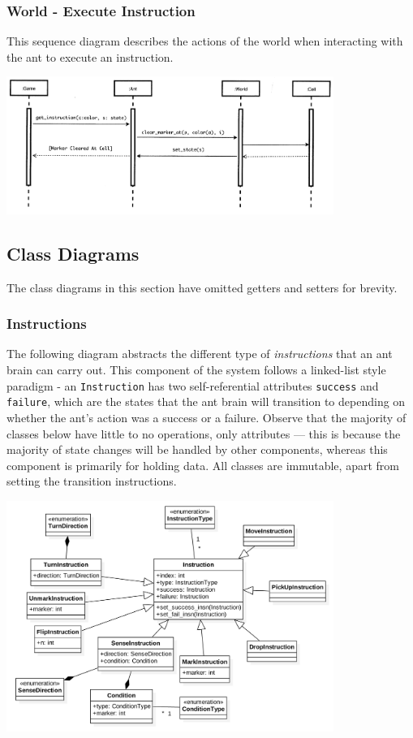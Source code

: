 \documentclass[11pt]{article}
\begin{document}
\subsubsection{World - Execute Instruction}

This sequence diagram describes the actions of the world when interacting with the ant to execute an instruction.

\begin{center}
\includegraphics[width=0.8\textwidth]{low-level-diagrams/sequence/ant-unmark.png}
\end{center}

\subsection{Class Diagrams}

The class diagrams in this section have omitted getters and setters for brevity.

\subsubsection{Instructions}

The following diagram abstracts the different type of \textit{instructions} that an ant brain can carry out. This component of the system follows a linked-list style paradigm - an \texttt{Instruction} has two self-referential attributes \texttt{success} and \texttt{failure}, which are the states that the ant brain will transition to depending on whether the ant's action was a success or a failure. Observe that the majority of classes below have little to no operations, only attributes --- this is because the majority of state changes will be handled by other components, whereas this component is primarily for holding data. All classes are immutable, apart from setting the transition instructions.
 
\begin{center}
\includegraphics[width=0.8\textwidth]{low-level-diagrams/class/instruction.png}
\end{center}
\end{document}
